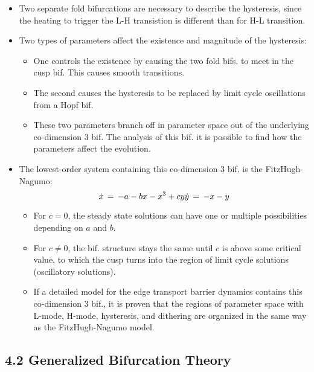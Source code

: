 \documentclass[a4paper]{article}
\begin{document}
\begin{itemize}
\item
  Two separate fold bifurcations are necessary to describe the
  hysteresis, since the heating to trigger the L-H transistion is
  different than for H-L transition.
\item
  Two types of parameters affect the existence and magnitude of the
  hysteresis:

  \begin{itemize}
  \item
    One controls the existence by causing the two fold bifs. to meet in
    the cusp bif. This causes smooth transitions.
  \item
    The second causes the hysteresis to be replaced by limit cycle
    oscillations from a Hopf bif.
  \item
    These two parameters branch off in parameter space out of the
    underlying co-dimension 3 bif. The analysis of this bif. it is
    possible to find how the parameters affect the evolution.
  \end{itemize}
\item
  The lowest-order system containing this co-dimension 3 bif. is the
  FitzHugh-Nagumo:
  \[\dot{x} \,=\, -a - bx - x^3 + cy \\ \dot{y} \,=\, -x - y\]

  \begin{itemize}
  \item
    For $c = 0$, the steady state solutions can have one or multiple
    possibilities depending on $a$ and $b$.
  \item
    For $c \neq 0$, the bif. structure stays the same until $c$ is above
    some critical value, to which the cusp turns into the region of
    limit cycle solutions (oscillatory solutions).
  \item
    If a detailed model for the edge transport barrier dynamics contains
    this co-dimension 3 bif., it is proven that the regions of parameter
    space with L-mode, H-mode, hysteresis, and dithering are organized
    in the same way as the FitzHugh-Nagumo model.
  \end{itemize}
\end{itemize}

\subsection{4.2 Generalized Bifurcation
Theory}\label{generalized-bifurcation-theory}
\end{document}
